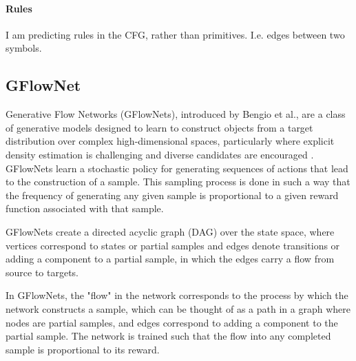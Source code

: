 \paragraph{Rules}
I am predicting rules in the CFG, rather than primitives. I.e. edges between two symbols.




\subsection{GFlowNet}






Generative Flow Networks (GFlowNets), introduced by Bengio et al., are a class of generative models designed to learn to construct objects from a target distribution over complex high-dimensional spaces, particularly where explicit density estimation is challenging and diverse candidates are encouraged \cite{bengio_flow_2021}. GFlowNets learn a stochastic policy for generating sequences of actions that lead to the construction of a sample. This sampling process is done in such a way that the frequency of generating any given sample is proportional to a given reward function associated with that sample.

GFlowNets create a directed acyclic graph (DAG) over the state space, where vertices correspond to states or partial samples and edges denote transitions or adding a component to a partial sample, in which the edges carry a flow from source to targets.

In GFlowNets, the "flow" in the network corresponds to the process by which the network constructs a sample, which can be thought of as a path in a graph where nodes are partial samples, and edges correspond to adding a component to the partial sample. The network is trained such that the flow into any completed sample is proportional to its reward.


